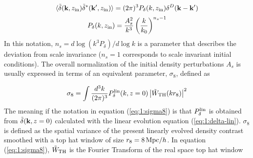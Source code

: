 \begin{equation}
\label{eq:1:initial-cond}
\langle\tilde{\delta}(\mathbf{k},z_{\rm in})\tilde{\delta}^*(\mathbf{k}',z_{\rm in})\rangle = (2\pi)^3 P_\delta(k,z_{\rm in})\delta^D(\mathbf{k}-\mathbf{k}')
\end{equation}
%
\begin{equation}
\label{eq:1:initial-ps}
P_\delta(k,z_{\rm in}) = \frac{A^2_s}{k^3}\left(\frac{k}{k_0}\right)^{n_s-1}
\end{equation}
%
In this notation, $n_s=d\log (k^3P_\delta)/d\log k$ is a parameter that describes the deviation from scale invariance ($n_s=1$ corresponds to scale invariant initial conditions). The overall normalization of the initial density perturbations $A_s$ is usually expressed in terms of an equivalent parameter, $\sigma_8$, defined as 

\begin{equation}
\label{eq:1:sigma8}
\sigma_8 = \int \frac{d^3k}{(2\pi)^3} P^{\rm lin}_\delta(k,z=0)\left\vert\tilde{W}_{\rm TH}(kr_8)\right\vert^2
\end{equation} 
%
The meaning if the notation in equation (\ref{eq:1:sigma8}) is that $P_\delta^{\rm lin}$ is obtained from $\tilde{\delta}(\mathbf{k},z=0)$ calculated with the linear evolution equation (\ref{eq:1:delta-lin}). $\sigma_8$ is defined as the spatial 
variance of the present linearly evolved density contrast smoothed with a top hat window of size $r_8=8\,{\rm Mpc}/h$. In equation (\ref{eq:1:sigma8}), $\tilde{W}_{\rm TH}$ is the Fourier Transform of the real space top hat window

